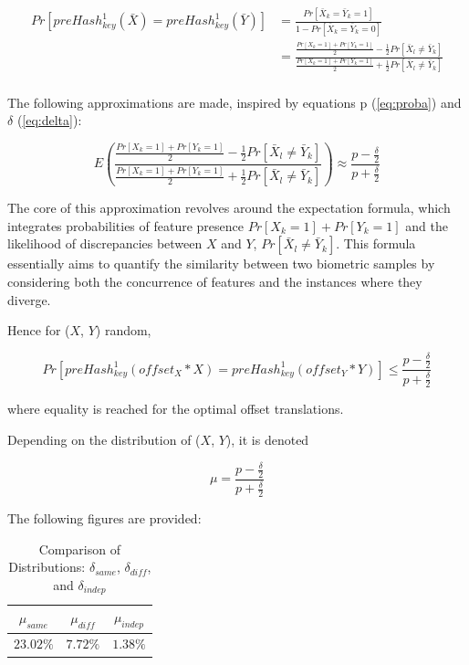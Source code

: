\begin{equation} \label{eq:preHash2}
    \begin{aligned}
        Pr[preHash_{key}^1(\bar{X}) = preHash_{key}^1(\bar{Y})] &= \frac{Pr[\bar{X}_k = \bar{Y}_k = 1]}{1 - Pr[\bar{X}_k = \bar{Y}_k = 0]}\\
        &= \frac{\frac{Pr[X_k = 1] + Pr[Y_k = 1]}{2} - \frac{1}{2}Pr[\bar{X}_l \neq \bar{Y}_k]}{\frac{Pr[X_k = 1] + Pr[Y_k = 1]}{2} + \frac{1}{2}Pr[\bar{X}_l \neq \bar{Y}_k]}\\
    \end{aligned}
\end{equation}

The following approximations are made, inspired by equations p (\ref{eq:proba}) and $\delta$ (\ref{eq:delta}):

\begin{equation}
    E\left(\frac{\frac{Pr[X_k = 1] + Pr[Y_k = 1]}{2} - \frac{1}{2}Pr[\bar{X}_l \neq \bar{Y}_k]}{\frac{Pr[X_k = 1] + Pr[Y_k = 1]}{2} + \frac{1}{2}Pr[\bar{X}_l \neq \bar{Y}_k]}\right) \approx \frac{p - \frac{\delta}{2}}{p + \frac{\delta}{2}}
\end{equation}

The core of this approximation revolves around the expectation formula, which integrates probabilities of feature presence \(Pr[X_k=1]+Pr[Y_k=1]\) and the likelihood of discrepancies between \(X\) and \(Y\), \(Pr[\bar{X}_l \neq \bar{Y}_k]\). This formula essentially aims to quantify the similarity between two biometric samples by considering both the concurrence of features and the instances where they diverge.

Hence for (\(X\), \(Y\)) random,

\begin{equation}
    \label{eq:mu_leq}
    Pr[preHash_{key}^1(offset_X * X) = preHash_{key}^1(offset_Y * Y)] \leq \frac{p - \frac{\delta}{2}}{p + \frac{\delta}{2}}
\end{equation}

where equality is reached for the optimal offset translations. 

Depending on the distribution of (\(X\), \(Y\)), it is denoted

\begin{equation} \label{eq:mu}
    \mu = \frac{p - \frac{\delta}{2}}{p + \frac{\delta}{2}}
\end{equation}

The following figures are provided:

\begin{table}[H]
    \centering
    \renewcommand{\arraystretch}{1.25}\begin{tabular}{|c|c|c|}
        \hline
        $\mu_{same}$ & $\mu_{diff}$ & $\mu_{indep}$\\
        \hline
        $23.02\%$ & $7.72\%$ & $1.38\%$\\
        \hline
    \end{tabular}
\caption{Comparison of Distributions: $\delta_{same}$, $\delta_{diff}$, and $\delta_{indep}$}
\end{table}

